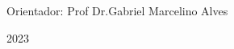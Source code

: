 \begin{center}
   	
   	\ABNTEXchapterfont\Large\textsc{\imprimirautor}
   	\vspace{2.5cm}
   	
   	\ABNTEXchapterfont\LARGE\textsc{\imprimirtitulo\ifdef{\osubtitulo}{:}{}}

    \ifdef{\osubtitulo}{\ABNTEXchapterfont\Large\imprimirsubtitulo}{}
   	\vspace{2.5cm}
   	   	
   	\hspace{.4\textwidth}
   	\begin{minipage}{.5\textwidth}
   		\SingleSpacing
   		
   		\vspace{\onelineskip}
   		
   		Orientador: Prof Dr.Gabriel Marcelino Alves
        
        
   		
   	\end{minipage}%
    \vfill
   	
   	\Large\textsc{\imprimirlocal}
   	
   	\Large\textsc{2023}
   	
   	\vspace*{2cm}
   	
\end{center}